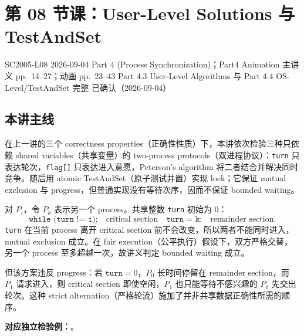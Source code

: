 
\section{第 08 节课：User-Level Solutions 与 TestAndSet}
\label{lecture:SC2005-L08}

\lecturemeta
  {SC2005-L08}
  {2026-09-04}
  {Part 4 (Process Synchronization)；Part4 Animation}
  {主讲义 pp.~14--27；动画 pp.~23--43}
  {Part 4.3 User-Level Algorithms 与 Part 4.4 OS-Level/TestAndSet 完整}
  {已确认（2026-09-04）}

\subsection{本讲主线}

在上一讲的三个 correctness properties（正确性性质）下，本讲依次检验三种只依赖 shared variables（共享变量）的 two-process protocols（双进程协议）：\texttt{turn} 只表达轮次，\texttt{flag[]} 只表达进入意愿，Peterson's algorithm 将二者结合并解决同时竞争。随后用 atomic TestAndSet（原子测试并置）实现 lock；它保证 mutual exclusion 与 progress，但普通实现没有等待次序，因而不保证 bounded waiting。



对 $P_i$，令 $P_k$ 表示另一个 process。共享整数 \texttt{turn} 初始为 $0$：
\[
  \texttt{while (turn != i);}\quad
  \text{critical section}\quad
  \texttt{turn = k;}\quad
  \text{remainder section}.
\]
\texttt{turn} 在当前 process 离开 critical section 前不会改变，所以两者不能同时进入，mutual exclusion 成立。在 fair execution（公平执行）假设下，双方严格交替，另一个 process 至多超越一次，故讲义判定 bounded waiting 成立。

但该方案违反 progress：若 $\texttt{turn}=0$，$P_0$ 长时间停留在 remainder section，而 $P_1$ 请求进入，则 critical section 即使空闲，$P_1$ 也只能等待不感兴趣的 $P_0$ 先交出轮次。这种 strict alternation（严格轮流）施加了并非共享数据正确性所需的顺序。

\textbf{对应独立检验例：}。


